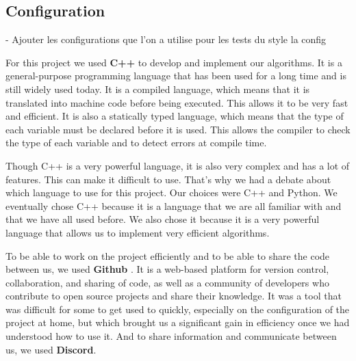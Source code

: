 \subsection{Configuration}

-  Ajouter les configurations que l'on a utilise pour les tests du style la config \newline

For this project we used \textbf{C++} to develop and implement our algorithms. 
It is a general-purpose programming language that has been used for a long time 
and is still widely used today. It is a compiled language, which means that it 
is translated into machine code before being executed. This allows it to be very 
fast and efficient. It is also a statically typed language, which means that the 
type of each variable must be declared before it is used. This allows the compiler 
to check the type of each variable and to detect errors at compile time. \newline

Though C++ is a very powerful language, it is also very complex and has a lot of
features. This can make it difficult to use. That's why we had a debate about
which language to use for this project. Our choices were C++ and Python. We
eventually chose C++ because it is a language that we are all familiar with and
that we have all used before. We also chose it because it is a very powerful
language that allows us to implement very efficient algorithms. \newline

To be able to work on the project efficiently and to be able to share the code
between us, we used \textbf{Github}\footnotemark 
{}.
It is a web-based platform for version control, collaboration, and sharing of
code, as well as a community of developers who contribute to open source projects
and share their knowledge. It was a tool that was difficult for some to get used
to quickly, especially on the configuration of the project at home, but which
brought us a significant gain in efficiency once we had understood how to use it.
And to share information and communicate between us, we used \textbf{Discord}.
